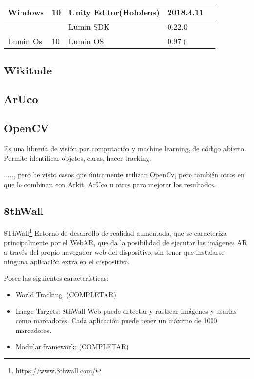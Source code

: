 \begin{table}[]
\begin{tabular}{|l|l|l|l|l|l|}
		\multirow{-3}{*}{Windows}  & \multirow{-3}{*}{10}     & \cellcolor[HTML]{EFEFEF}Unity Editor(Hololens) & \cellcolor[HTML]{EFEFEF}2018.4.11          & \multicolumn{2}{l|}{\multirow{-3}{*}{}}             \\ \hline
		&                          & Lumin SDK                                      & 0.22.0                                     & \multicolumn{2}{l|}{}                               \\ \cline{3-4}
		\multirow{-2}{*}{Lumin Os} & \multirow{-2}{*}{10}     & \cellcolor[HTML]{EFEFEF}Lumin OS               & \cellcolor[HTML]{EFEFEF}0.97+              & \multicolumn{2}{l|}{\multirow{-2}{*}{}}             \\ \hline
	\end{tabular}
\end{table}


\subsection{Wikitude}


\subsection{ArUco}


\subsection{OpenCV}
Es una librería de visión por computación y machine learning, de código abierto. Permite identificar objetos, caras, hacer tracking..

....., pero he visto casos que únicamente utilizan OpenCv, pero también otros en que lo combinan con Arkit, ArUco u otros para mejorar los resultados.


\subsection{8thWall}
8ThWall\footnote{\url{https://www.8thwall.com/}}
Entorno de desarrollo de realidad aumentada, que se caracteriza principalmente por el WebAR, que da la posibilidad de ejecutar las imágenes AR a través del propio navegador web del dispositivo, sin tener que instalarse ninguna aplicación extra en el dispositivo. 

Posee las siguientes características:
\begin{itemize}
	\item World Tracking: (COMPLETAR)
	\item Image Targets: 8thWall Web puede detectar y rastrear imágenes y usarlas como marcadores. Cada aplicación puede tener un máximo de 1000 marcadores.
	\item Modular framework: (COMPLETAR)
\end{itemize}


